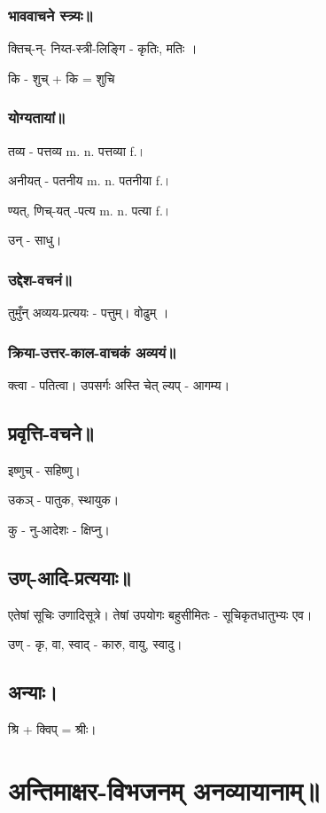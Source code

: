 \documentclass[oneside, article]{memoir}
\begin{document}
\subsubsection{भाववाचने स्त्र्यः॥}
क्तिच्-न्- निय्त-स्त्री-लिङ्गि - कृतिः, मतिः ।

कि - शुच् + कि = शुचि

\subsubsection{योग्यतायां॥}
तव्य - पत्तव्य m. n. पत्तव्या f.। 

अनीयत् - पतनीय m. n. पतनीया f.।

ण्यत्, णिच्-यत् -पत्य m. n. पत्या f.।

उन् - साधु।

\subsubsection{उद्देश-वचनं॥}
तुमुँन् अव्यय-प्रत्ययः - पत्तुम्। वोढुम् । 

\subsubsection{क्रिया-उत्तर-काल-वाचकं अव्ययं॥}
क्त्वा - पतित्वा। उपसर्गः अस्ति चेत् ल्यप् - आगम्य।

\subsection{प्रवृत्ति-वचने॥}
इष्णुच् - सहिष्णु।

उकञ् - पातुक, स्थायुक।

कु - नु-आदेशः - क्षिप्नु।

\subsection{उण्-आदि-प्रत्ययाः॥}
एतेषां सूचिः उणादिसूत्रे। तेषां उपयोगः बहुसीमितः - सूचिकृतधातुभ्यः एव।

उण् - कृ, वा, स्वाद् - कारु, वायु, स्वादु।

\subsection{अन्याः।}
श्रि + क्विप् = श्रीः।

\section{अन्तिमाक्षर-विभजनम् अनव्यायानाम्॥}
\end{document}

